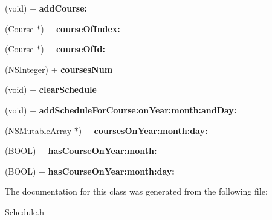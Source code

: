 \begin{DoxyCompactItemize}
\item 
\hypertarget{interface_schedule_aaf0faf41937c9aadd2f2ff4d48a1c05c}{(void) + {\bfseries add\+Course\+:}}\label{interface_schedule_aaf0faf41937c9aadd2f2ff4d48a1c05c}

\item 
\hypertarget{interface_schedule_a03e94ae11617def2eab930763bdf12ff}{(\hyperlink{interface_course}{Course} $\ast$) + {\bfseries course\+Of\+Index\+:}}\label{interface_schedule_a03e94ae11617def2eab930763bdf12ff}

\item 
\hypertarget{interface_schedule_a73f0de53e33bdca11901f0fe114e87a4}{(\hyperlink{interface_course}{Course} $\ast$) + {\bfseries course\+Of\+Id\+:}}\label{interface_schedule_a73f0de53e33bdca11901f0fe114e87a4}

\item 
\hypertarget{interface_schedule_a76bd11cfa62f71354bde9e3f7079e2e5}{(N\+S\+Integer) + {\bfseries courses\+Num}}\label{interface_schedule_a76bd11cfa62f71354bde9e3f7079e2e5}

\item 
\hypertarget{interface_schedule_a0e70c390bb07cd134cbc7f0090ef52b0}{(void) + {\bfseries clear\+Schedule}}\label{interface_schedule_a0e70c390bb07cd134cbc7f0090ef52b0}

\item 
\hypertarget{interface_schedule_a98322100b735481ca7bf493035f11598}{(void) + {\bfseries add\+Schedule\+For\+Course\+:on\+Year\+:month\+:and\+Day\+:}}\label{interface_schedule_a98322100b735481ca7bf493035f11598}

\item 
\hypertarget{interface_schedule_a61fa3ed66f093a19097af1eb7e030099}{(N\+S\+Mutable\+Array $\ast$) + {\bfseries courses\+On\+Year\+:month\+:day\+:}}\label{interface_schedule_a61fa3ed66f093a19097af1eb7e030099}

\item 
\hypertarget{interface_schedule_a17a17dcc7d2d32962be64766309e4a7f}{(B\+O\+O\+L) + {\bfseries has\+Course\+On\+Year\+:month\+:}}\label{interface_schedule_a17a17dcc7d2d32962be64766309e4a7f}

\item 
\hypertarget{interface_schedule_aa38b3bb92219023117fe0686f68fb8bc}{(B\+O\+O\+L) + {\bfseries has\+Course\+On\+Year\+:month\+:day\+:}}\label{interface_schedule_aa38b3bb92219023117fe0686f68fb8bc}

\end{DoxyCompactItemize}


The documentation for this class was generated from the following file\+:\begin{DoxyCompactItemize}
\item 
Schedule.\+h\end{DoxyCompactItemize}
